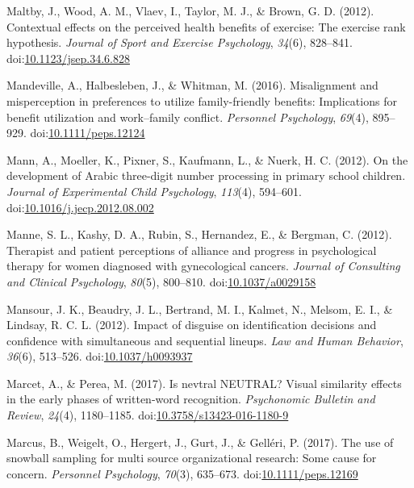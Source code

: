 \documentclass[english,man]{apa6}
\begin{document}
\hypertarget{ref-Maltby2012}{}
Maltby, J., Wood, A. M., Vlaev, I., Taylor, M. J., \& Brown, G. D.
(2012). Contextual effects on the perceived health benefits of exercise:
The exercise rank hypothesis. \emph{Journal of Sport and Exercise
Psychology}, \emph{34}(6), 828--841.
doi:\href{https://doi.org/10.1123/jsep.34.6.828}{10.1123/jsep.34.6.828}

\hypertarget{ref-Mandeville2016}{}
Mandeville, A., Halbesleben, J., \& Whitman, M. (2016). Misalignment and
misperception in preferences to utilize family-friendly benefits:
Implications for benefit utilization and work--family conflict.
\emph{Personnel Psychology}, \emph{69}(4), 895--929.
doi:\href{https://doi.org/10.1111/peps.12124}{10.1111/peps.12124}

\hypertarget{ref-Mann2012}{}
Mann, A., Moeller, K., Pixner, S., Kaufmann, L., \& Nuerk, H. C. (2012).
On the development of Arabic three-digit number processing in primary
school children. \emph{Journal of Experimental Child Psychology},
\emph{113}(4), 594--601.
doi:\href{https://doi.org/10.1016/j.jecp.2012.08.002}{10.1016/j.jecp.2012.08.002}

\hypertarget{ref-Manne2012}{}
Manne, S. L., Kashy, D. A., Rubin, S., Hernandez, E., \& Bergman, C.
(2012). Therapist and patient perceptions of alliance and progress in
psychological therapy for women diagnosed with gynecological cancers.
\emph{Journal of Consulting and Clinical Psychology}, \emph{80}(5),
800--810. doi:\href{https://doi.org/10.1037/a0029158}{10.1037/a0029158}

\hypertarget{ref-Mansour2012}{}
Mansour, J. K., Beaudry, J. L., Bertrand, M. I., Kalmet, N., Melsom, E.
I., \& Lindsay, R. C. L. (2012). Impact of disguise on identification
decisions and confidence with simultaneous and sequential lineups.
\emph{Law and Human Behavior}, \emph{36}(6), 513--526.
doi:\href{https://doi.org/10.1037/h0093937}{10.1037/h0093937}

\hypertarget{ref-Marcet2016}{}
Marcet, A., \& Perea, M. (2017). Is nevtral NEUTRAL? Visual similarity
effects in the early phases of written-word recognition.
\emph{Psychonomic Bulletin and Review}, \emph{24}(4), 1180--1185.
doi:\href{https://doi.org/10.3758/s13423-016-1180-9}{10.3758/s13423-016-1180-9}

\hypertarget{ref-Marcus2017}{}
Marcus, B., Weigelt, O., Hergert, J., Gurt, J., \& Gelléri, P. (2017).
The use of snowball sampling for multi source organizational research:
Some cause for concern. \emph{Personnel Psychology}, \emph{70}(3),
635--673.
doi:\href{https://doi.org/10.1111/peps.12169}{10.1111/peps.12169}
\end{document}
